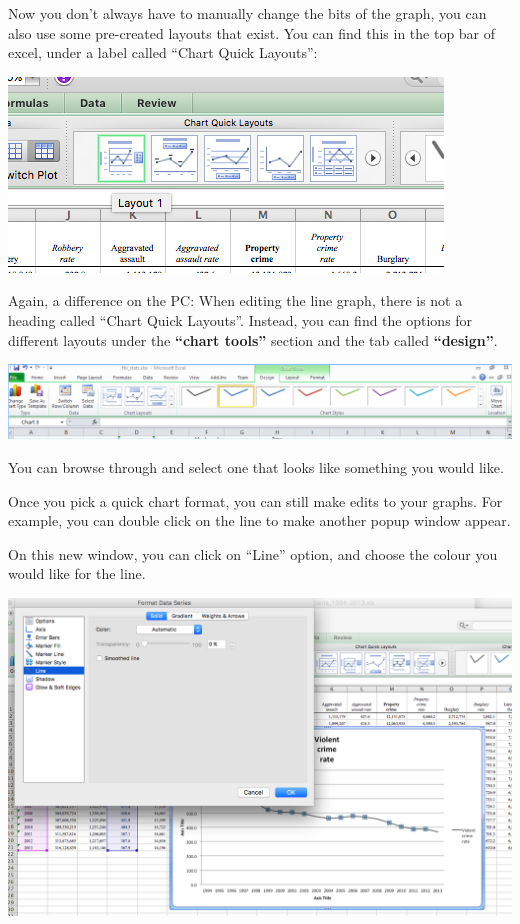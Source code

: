 \documentclass[]{book}
\theoremstyle{definition}
\theoremstyle{definition}
\theoremstyle{definition}
\theoremstyle{remark}
\begin{document}
Now you don't always have to manually change the bits of the graph, you
can also use some pre-created layouts that exist. You can find this in
the top bar of excel, under a label called ``Chart Quick Layouts'':

\includegraphics{imgs/desc_line_layout.png}

Again, a difference on the PC: When editing the line graph, there is not
a heading called ``Chart Quick Layouts''. Instead, you can find the
options for different layouts under the \textbf{``chart tools''} section
and the tab called \textbf{``design''}.

\includegraphics{imgs/pc_chart_tools.png}

You can browse through and select one that looks like something you
would like.

Once you pick a quick chart format, you can still make edits to your
graphs. For example, you can double click on the line to make another
popup window appear.

On this new window, you can click on ``Line'' option, and choose the
colour you would like for the line.

\includegraphics{imgs/desc_line_edit.png}
\end{document}
